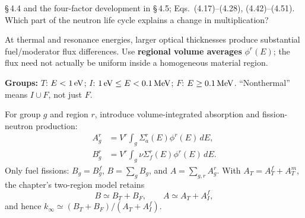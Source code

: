 \documentclass{ne630handout}
\begin{document}
\fontsize{9.5}{11.5}\selectfont
\RaggedRight

 {\S\,4.4 and the four-factor development in \S\,4.5; Eqs.\ (4.17)--(4.28), (4.42)--(4.51).}
 {Which part of the neutron life cycle explains a change in multiplication?}
\begin{center}\resizebox{.995\linewidth}{!}{\CycleFigure}\end{center}
\vspace{-7pt}
\colstart
{}
At thermal and resonance energies, larger optical thicknesses produce substantial fuel/moderator flux differences. Use \textbf{regional volume averages} $\phi^r(E)$; the flux need not actually be uniform inside a homogeneous material region.

\textbf{Groups:} $T$: $E<1\,\mathrm{eV}$; $I$: $1\,\mathrm{eV}\le E<0.1\,\mathrm{MeV}$; $F$: $E\ge0.1\,\mathrm{MeV}$. ``Nonthermal'' means $I\cup F$, not just $F$.

For group $g$ and region $r$, introduce volume-integrated absorption and fission-neutron production:
\begin{align*}
 A_g^r&=V^r\int_g\Sigma_a^r(E)\phi^r(E)\,dE,\\
 B_g^r&=V^r\int_g\nu\Sigma_f^r(E)\phi^r(E)\,dE.
\end{align*}
Only fuel fissions: $B_g=B_g^f$, $B=\sum_g B_g$, and $A=\sum_{g,r}A_g^r$. With $A_T=A_T^f+A_T^m$, the chapter's two-region model retains
\[
 B\simeq B_T+B_F,\qquad A\simeq A_T+A_I^f,
\]
and hence $k_\infty\simeq(B_T+B_F)/(A_T+A_I^f)$.
\end{document}
